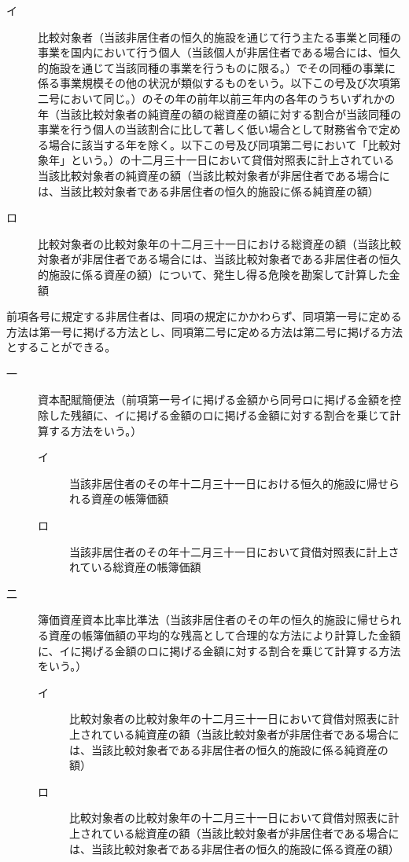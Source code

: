 \documentclass[twocolumn,a4j,10pt]{ltjtarticle}
\begin{document}
\begin{description}
\begin{description}
\begin{description}
\item[イ]比較対象者（当該非居住者の恒久的施設を通じて行う主たる事業と同種の事業を国内において行う個人（当該個人が非居住者である場合には、恒久的施設を通じて当該同種の事業を行うものに限る。）でその同種の事業に係る事業規模その他の状況が類似するものをいう。以下この号及び次項第二号において同じ。）のその年の前年以前三年内の各年のうちいずれかの年（当該比較対象者の純資産の額の総資産の額に対する割合が当該同種の事業を行う個人の当該割合に比して著しく低い場合として財務省令で定める場合に該当する年を除く。以下この号及び同項第二号において「比較対象年」という。）の十二月三十一日において貸借対照表に計上されている当該比較対象者の純資産の額（当該比較対象者が非居住者である場合には、当該比較対象者である非居住者の恒久的施設に係る純資産の額）
\item[ロ]比較対象者の比較対象年の十二月三十一日における総資産の額（当該比較対象者が非居住者である場合には、当該比較対象者である非居住者の恒久的施設に係る資産の額）について、発生し得る危険を勘案して計算した金額
\end{description}
\end{description}
\item[\rensuji{3}]前項各号に規定する非居住者は、同項の規定にかかわらず、同項第一号に定める方法は第一号に掲げる方法とし、同項第二号に定める方法は第二号に掲げる方法とすることができる。
\begin{description}
\item[一]資本配賦簡便法（前項第一号イに掲げる金額から同号ロに掲げる金額を控除した残額に、イに掲げる金額のロに掲げる金額に対する割合を乗じて計算する方法をいう。）
\begin{description}
\item[イ]当該非居住者のその年十二月三十一日における恒久的施設に帰せられる資産の帳簿価額
\item[ロ]当該非居住者のその年十二月三十一日において貸借対照表に計上されている総資産の帳簿価額
\end{description}
\item[二]簿価資産資本比率比準法（当該非居住者のその年の恒久的施設に帰せられる資産の帳簿価額の平均的な残高として合理的な方法により計算した金額に、イに掲げる金額のロに掲げる金額に対する割合を乗じて計算する方法をいう。）
\begin{description}
\item[イ]比較対象者の比較対象年の十二月三十一日において貸借対照表に計上されている純資産の額（当該比較対象者が非居住者である場合には、当該比較対象者である非居住者の恒久的施設に係る純資産の額）
\item[ロ]比較対象者の比較対象年の十二月三十一日において貸借対照表に計上されている総資産の額（当該比較対象者が非居住者である場合には、当該比較対象者である非居住者の恒久的施設に係る資産の額）

\end{description}
\end{description}
\end{description}
\end{document}
